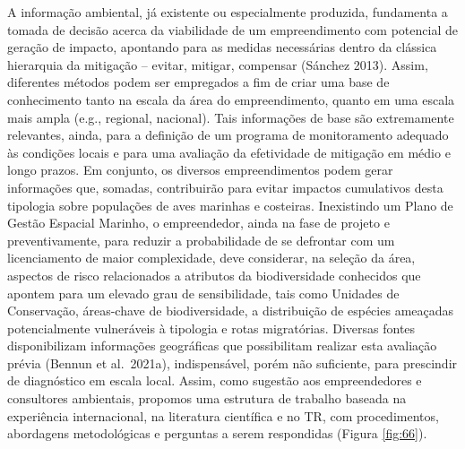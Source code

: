 \documentclass[
  oneside]{scrbook}
\begin{document}
A informação ambiental, já existente ou especialmente produzida, fundamenta a tomada de decisão acerca da viabilidade de um empreendimento com potencial de geração de impacto, apontando para as medidas necessárias dentro da clássica hierarquia da mitigação -- evitar, mitigar, compensar (Sánchez 2013). Assim, diferentes métodos podem ser empregados a fim de criar uma base de conhecimento tanto na escala da área do empreendimento, quanto em uma escala mais ampla (e.g., regional, nacional). Tais informações de base são extremamente relevantes, ainda, para a definição de um programa de monitoramento adequado às condições locais e para uma avaliação da efetividade de mitigação em médio e longo prazos. Em conjunto, os diversos empreendimentos podem gerar informações que, somadas, contribuirão para evitar impactos cumulativos desta tipologia sobre populações de aves marinhas e costeiras. Inexistindo um Plano de Gestão Espacial Marinho, o empreendedor, ainda na fase de projeto e preventivamente, para reduzir a probabilidade de se defrontar com um licenciamento de maior complexidade, deve considerar, na seleção da área, aspectos de risco relacionados a atributos da biodiversidade conhecidos que apontem para um elevado grau de sensibilidade, tais como Unidades de Conservação, áreas-chave de biodiversidade, a distribuição de espécies ameaçadas potencialmente vulneráveis à tipologia e rotas migratórias. Diversas fontes disponibilizam informações geográficas que possibilitam realizar esta avaliação prévia (Bennun et al.~2021a), indispensável, porém não suficiente, para prescindir de diagnóstico em escala local. Assim, como sugestão aos empreendedores e consultores ambientais, propomos uma estrutura de trabalho baseada na experiência internacional, na literatura científica e no TR, com procedimentos, abordagens metodológicas e perguntas a serem respondidas (Figura \ref{fig:66}).
\end{document}
